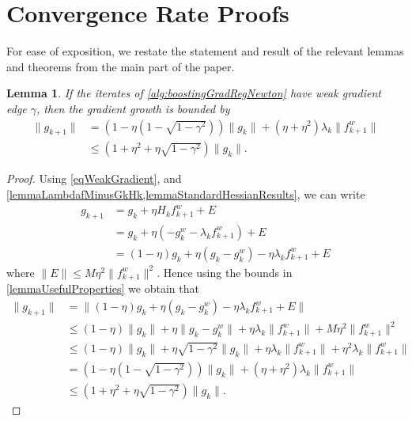 \documentclass{article}
\theoremstyle{plain}
\newtheorem{lemma}[theorem]{Lemma}
\theoremstyle{definition}
\theoremstyle{remark}
\begin{document}
\clearpage
\section{Convergence Rate Proofs}\label{app:GlobalConvergenceProofs}

For ease of exposition, we restate the statement and result of the relevant lemmas and theorems from the main part of the paper.

\begin{lemma}\label{appendixLemmaGradientGrowth}
    If the iterates of \cref{alg:boostingGradRegNewton} have weak gradient edge $\gamma$, then the gradient growth is bounded by
    \begin{align}
        \|g_{k+1}\| 
        &= \left(1-\eta(1-\sqrt{1-\gamma^2})\right)\|g_k\| + (\eta+\eta^2)\lambda_k \|f_{k+1}^w\| \\
        &\leq \left(1 + \eta^2 + \eta \sqrt{1-\gamma^2}\right)\|g_k\|.
    \end{align}
\end{lemma}
\begin{proof}
    Using \cref{eqWeakGradient}, and \cref{lemmaLambdafMinusGkHk,lemmaStandardHessianResults}, we can write
    \begin{align}
        g_{k+1} 
        &= g_k + \eta H_k f^w_{k+1} + E \\
        &= g_k + \eta (-g_k^w-\lambda_k f_{k+1}^w) + E \\
        &= (1-\eta) g_k + \eta(g_k - g_k^w) - \eta \lambda_k f^w_{k+1} + E
    \end{align}
    where $\|E\| \leq M\eta^2 \|f^w_{k+1}\|^2$. Hence using the bounds in \cref{lemmaUsefulProperties} we obtain that
    \begin{align}
        \|g_{k+1}\| 
        &= \| (1-\eta) g_k + \eta(g_k - g_k^w) - \eta\lambda_k f^w_{k+1} + E \| \\
        &\leq (1-\eta) \|g_k\| + \eta \|g_k - g_k^w\| +  \eta \lambda_k \|f^w_{k+1}\| + M \eta^2 \|f^w_{k+1}\|^2 \label{eqGradientRecursionForLater}\\
        &\leq (1-\eta) \|g_k\| + \eta \sqrt{1-\gamma^2}\|g_k\| +  \eta \lambda_k \|f^w_{k+1}\| + \eta^2 \lambda_k \|f^w_{k+1}\| \\
        &= \left(1-\eta(1-\sqrt{1-\gamma^2})\right)\|g_k\| + (\eta+\eta^2)\lambda_k \|f_{k+1}^w\| \\
        &\leq \left(1 + \eta^2 + \eta \sqrt{1-\gamma^2}\right)\|g_k\|.
    \end{align}
\end{proof}
\end{document}
